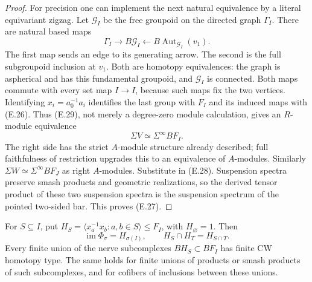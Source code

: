\begin{proof}
For precision one can implement the next natural equivalence by a
literal equivariant zigzag.  Let $\mathcal G_I$ be the free groupoid
on the directed graph $\Gamma_I$.  There are natural based maps
\[
 \Gamma_I\longrightarrow B\mathcal G_I
       \longleftarrow B\operatorname{Aut}_{\mathcal G_I}(v_1).
                                                               \tag{E.29}
\]
The first map sends an edge to its generating arrow.  The second is
the full subgroupoid inclusion at $v_1$.  Both are homotopy
equivalences: the graph is aspherical and has this fundamental
groupoid, and $\mathcal G_I$ is connected.  Both maps commute with
every set map $I\to I$, because such maps fix the two vertices.
Identifying $x_i=a_0^{-1}a_i$ identifies the last group with $F_I$
and its induced maps with (E.26).  Thus (E.29), not merely a
degree-zero module calculation, gives an $R$-module equivalence
\[
 \Sigma V\simeq\Sigma^\infty BF_I.
\]
The right side has the strict $A$-module structure already described;
full faithfulness of restriction upgrades this to an equivalence of
$A$-modules.  Similarly $\Sigma W\simeq\Sigma^\infty BF_J$ as right
$A$-modules.  Substitute in (E.28).  Suspension spectra preserve
smash products and geometric realizations, so the derived tensor
product of these two suspension spectra is the suspension spectrum
of the pointed two-sided bar.  This proves (E.27).
\end{proof}

\begin{lemma}\label{E:free-subset-intersections}
For $S\subseteq I$, put
$H_S=\langle x_a^{-1}x_b:a,b\in S\rangle\leq F_I$,
with $H_\varnothing=1$.  Then
\[
 \operatorname{im}\Phi_\sigma=H_{\sigma(I)},\qquad
 H_S\cap H_T=H_{S\cap T}.                              \tag{E.30}
\]
Every finite union of the nerve subcomplexes $BH_S\subset BF_I$
has finite CW homotopy type.  The same holds for finite unions of
products or smash products of such subcomplexes, and for cofibers of
inclusions between these unions.
\end{lemma}


